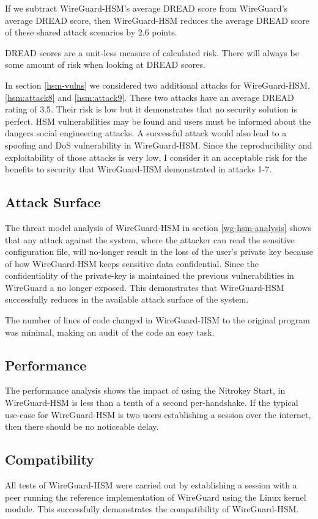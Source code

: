 \documentclass [11pt, proquest] {uwthesis}[2020/02/24]
\begin{document}
If we subtract WireGuard-HSM's average DREAD score from WireGuard's average DREAD score, then WireGuard-HSM reduces the average DREAD score of these shared attack scenarios by 2.6 points.

DREAD scores are a unit-less measure of calculated risk. There will always be some amount of risk when looking at DREAD scores.

In section \ref{hsm-vulns} we considered two additional attacks for WireGuard-HSM, \ref{hsm:attack8} and \ref{hsm:attack9}. 
These two attacks have an average DREAD rating of 3.5. Their risk is low but it demonstrates that no security solution is perfect. HSM vulnerabilities may be found and users must be informed about the dangers social engineering attacks.
A successful attack would also lead to a spoofing and DoS vulnerability in WireGuard-HSM. Since the reproducibility and exploitability of those attacks is very low, I consider it an acceptable risk for the benefits to security that WireGuard-HSM demonstrated in attacks 1-7.


\subsection{Attack Surface}
\label{attacksurface}
The threat model analysis of WireGuard-HSM in section \ref{wg-hsm-analysis} shows that any attack against the system, where the attacker can read the sensitive configuration file, will no-longer result in the loss of the user's private key because of how WireGuard-HSM keeps sensitive data confidential. Since the confidentiality of the private-key is maintained the previous vulnerabilities in WireGuard a no longer exposed. This demonstrates that WireGuard-HSM successfully reduces in the available attack surface of the system.

The number of lines of code changed in WireGuard-HSM to the original program was minimal, making an audit of the code an easy task.

\subsection{Performance}
The performance analysis shows the impact of using the Nitrokey Start, in WireGuard-HSM is less than a tenth of a second per-handshake. If the typical use-case for WireGuard-HSM is two users establishing a session over the internet, then there should be no noticeable delay.

\subsection{Compatibility}
All tests of WireGuard-HSM were carried out by establishing a session with a peer running the reference implementation of WireGuard using the Linux kernel module. This successfully demonstrates the compatibility of WireGuard-HSM.
\end{document}
